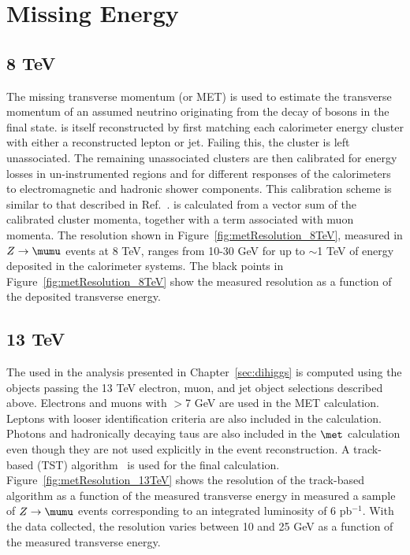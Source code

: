 \section{Missing Energy}
\subsection{8 TeV}
The missing transverse momentum (\met or MET) is used to estimate the
transverse momentum of an assumed neutrino originating from the decay
of \w bosons in the \ttbar final state.  \met is itself reconstructed
by first matching each calorimeter energy cluster with either a
reconstructed lepton or jet.  Failing this, the cluster is left
unassociated.  The remaining unassociated clusters are then calibrated
for energy losses in un-instrumented regions and for different
responses of the calorimeters to electromagnetic and hadronic shower
components.  This calibration scheme is similar to that described in
Ref.~\cite{ref:ATLAS-CONF-2011-080}. \met is calculated from a
vector sum of the calibrated cluster momenta, together with a term
associated with muon momenta. The \met resolution shown in Figure~\ref{fig:metResolution_8TeV}, measured in $Z\rightarrow\mumu$ events at 8 TeV, ranges from 10-30 GeV for up to $\sim$1 TeV of energy deposited in the calorimeter systems. The black points in Figure~\ref{fig:metResolution_8TeV} show the measured resolution as a function of the deposited transverse energy.

\subsection{13 TeV}	
The \met used in the analysis presented in Chapter~\ref{sec:dihiggs} is computed 
using the objects passing the 13 TeV electron, muon, and jet object selections described above. Electrons and muons with \pt$>$7 GeV are used in the MET calculation. Leptons with looser identification criteria are also included in the \met calculation. Photons and hadronically decaying taus are also included in the $\met$ calculation even though they are not used explicitly in the event reconstruction. A track-based (TST) algorithm~\cite{ATL-PHYS-PUB-2015-027} is used for the final \met calculation. Figure~\ref{fig:metResolution_13TeV} shows the resolution of the track-based algorithm as a function of the measured transverse energy in measured a sample of $Z\rightarrow\mumu$ events corresponding to an integrated luminosity of 6 pb$^{-1}$. With the data collected, the \met resolution varies between 10 and 25 GeV as a function of the measured transverse energy.


